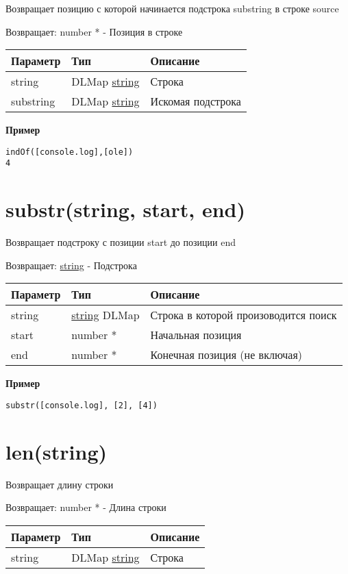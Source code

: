 Возвращает позицию с которой начинается подстрока substring в строке
source

Возвращает: number \textbar{} * - Позиция в строке

\begin{longtable}[]{@{}lll@{}}
\toprule
Параметр & Тип & Описание\tabularnewline
\midrule
\endhead
string & DLMap \textbar{} \protect\hyperlink{string}{string} &
Строка\tabularnewline
substring & DLMap \textbar{} \protect\hyperlink{string}{string} &
Искомая подстрока\tabularnewline
\bottomrule
\end{longtable}

\textbf{Пример}

\begin{verbatim}
indOf([console.log],[ole])
4
\end{verbatim}

\hypertarget{substrstring-start-end-string}{%
\section{substr(string, start, end)}\label{substrstring-start-end-string}}

Возвращает подстроку с позиции start до позиции end

Возвращает: \protect\hyperlink{string}{string} - Подстрока

\begin{longtable}[]{@{}lll@{}}
\toprule
Параметр & Тип & Описание\tabularnewline
\midrule
\endhead
string & \protect\hyperlink{string}{string} \textbar{} DLMap & Строка в
которой произоводится поиск\tabularnewline
start & number \textbar{} * & Начальная позиция\tabularnewline
end & number \textbar{} * & Конечная позиция (не включая)\tabularnewline
\bottomrule
\end{longtable}

\textbf{Пример}

\begin{verbatim}
substr([console.log], [2], [4])
\end{verbatim}

\hypertarget{lenstring-number}{%
\section{len(string)}\label{lenstring-number}}

Возвращает длину строки

Возвращает: number \textbar{} * - Длина строки

\begin{longtable}[]{@{}lll@{}}
\toprule
Параметр & Тип & Описание\tabularnewline
\midrule
\endhead
string & DLMap \textbar{} \protect\hyperlink{string}{string} &
Строка\tabularnewline
\bottomrule
\end{longtable}


